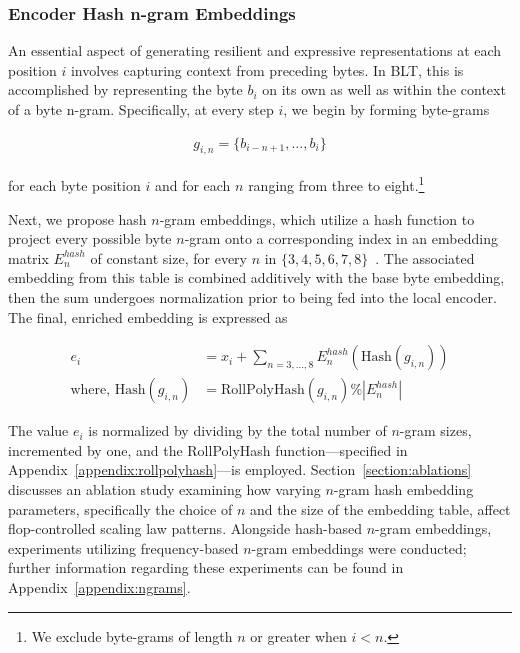 \subsubsection{Encoder Hash n-gram Embeddings}
\label{sec:ngram-emb}
\label{sec:hash-emb}
An essential aspect of generating resilient and expressive representations at each position $i$ involves capturing context from preceding bytes. In {\textsc BLT}, this is accomplished by representing the byte $b_i$ on its own as well as within the context of a byte n-gram. Specifically, at every step $i$, we begin by forming byte-grams

\begin{align}
    g_{i,n}=\{b_{i-n + 1},\ldots, b_i\}
\end{align}

for each byte position $i$ and for each $n$ ranging from three to eight.\footnote{
We exclude byte-grams of length $n$ or greater when $i < n$. }

Next, we propose hash $n$-gram embeddings, which utilize a hash function to project every possible byte $n$-gram onto a corresponding index in an embedding matrix $E_{n}^{hash}$ of constant size, for every $n$ in $\{3, 4, 5, 6, 7, 8\}$~\citep{bai2010learning}.
The associated embedding from this table is combined additively with the base byte embedding, then the sum undergoes normalization prior to being fed into the local encoder. The final, enriched embedding is expressed as

\begin{align}
e_i &= x_i + \sum_{n = 3,...,8}E_{n}^{hash}(\text{Hash}(g_{i,n})) \\
\text{where, Hash}(g_{i,n}) &= \text{RollPolyHash}(g_{i,n}) \% |E_{n}^{hash}|
\end{align}

The value $e_i$ is normalized by dividing by the total number of $n$-gram sizes, incremented by one, and the RollPolyHash function—specified in Appendix~\ref{appendix:rollpolyhash}—is employed. Section~\ref{section:ablations} discusses an ablation study examining how varying $n$-gram hash embedding parameters, specifically the choice of $n$ and the size of the embedding table, affect flop-controlled scaling law patterns. Alongside hash-based $n$-gram embeddings, experiments utilizing frequency-based $n$-gram embeddings were conducted; further information regarding these experiments can be found in Appendix~\ref{appendix:ngrams}.

